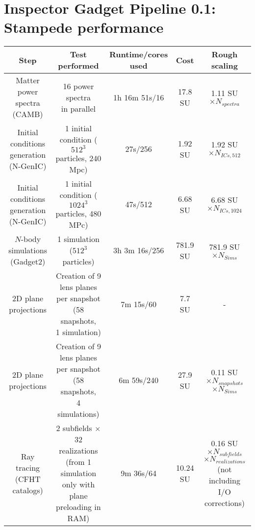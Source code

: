 \documentclass[11pt]{article}
\begin{document}
\section*{Inspector Gadget Pipeline 0.1: Stampede performance}

\begin{table}[h!]
\begin{center}
\begin{tabular}{c|c|c|c|c}
\textbf{Step} & \textbf{Test performed} & \textbf{Runtime/cores used} & \textbf{Cost} & \textbf{Rough scaling} \\ \hline
\pbox{20cm}{Matter power spectra \\ (CAMB)} & \pbox{20cm}{16 power spectra \\ in parallel} & 1h 16m 51s/16 & 17.8 SU & 1.11 SU $\times N_{spectra}$ \\ \hline
\pbox{20cm}{Initial conditions\\ generation (N-GenIC)} & \pbox{20cm}{1 initial condition \\ ($512^3$ particles, 240 Mpc)} & 27s/256 & 1.92 SU & 1.92 SU $\times N_{ICs,512}$ \\ \hline
\pbox{20cm}{Initial conditions\\ generation (N-GenIC)} & \pbox{20cm}{1 initial condition \\ ($1024^3$ particles, 480 MPc)} & 47s/512 & 6.68 SU & 6.68 SU $\times N_{ICs,1024}$ \\ \hline
\pbox{20cm}{$N$-body simulations\\ (Gadget2)} & \pbox{20cm}{1 simulation \\ ($512^3$ particles)} & 3h 3m 16s/256 & 781.9 SU & 781.9 SU $\times N_{Sims}$ \\ \hline
2D plane projections & \pbox{20cm}{Creation of 9 lens planes \\ per snapshot (58 snapshots,\\ 1 simulation)} & 7m 15s/60 & 7.7 SU & - \\ \hline
2D plane projections & \pbox{20cm}{Creation of 9 lens planes \\ per snapshot (58 snapshots,\\ 4 simulations)} & 6m 59s/240 & 27.9 SU & \pbox{20cm}{0.11 SU$\times N_{snapshots}$ \\ $\times N_{Sims}$} \\ \hline
\pbox{20cm}{Ray tracing \\ (CFHT catalogs)} & \pbox{20cm}{2 subfields $\times$ 32 realizations \\ (from 1 simulation only \\with plane \\preloading in RAM)} & 9m 36s/64 & 10.24 SU & \pbox{20cm}{0.16 SU $\times N_{subfields}$\\ $\times N_{realizations}$\\ (not including \\ I/O corrections)} \\ \hline

\end{tabular}
\end{center}
\end{table}
\end{document}
